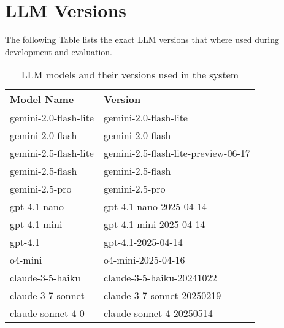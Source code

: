\section{LLM Versions}
The following Table lists the exact LLM versions that where used during development and evaluation.
\begin{longtable}{p{5cm} | p{6cm}}
    \caption{LLM models and their versions used in the system} \label{table:llm_versions} \\
    \hline
    \textbf{Model Name}   & \textbf{Version}                                              \\
    \hline
    \endfirsthead
    \hline
    \endfoot
    gemini-2.0-flash-lite & gemini-2.0-flash-lite                                         \\
    gemini-2.0-flash      & gemini-2.0-flash                                              \\
    gemini-2.5-flash-lite & gemini-2.5-flash-lite-preview-06-17                           \\
    gemini-2.5-flash      & gemini-2.5-flash                                              \\
    gemini-2.5-pro        & gemini-2.5-pro                                                \\
    gpt-4.1-nano          & gpt-4.1-nano-2025-04-14                                       \\
    gpt-4.1-mini          & gpt-4.1-mini-2025-04-14                                       \\
    gpt-4.1               & gpt-4.1-2025-04-14                                            \\
    o4-mini               & o4-mini-2025-04-16                                            \\
    claude-3-5-haiku      & claude-3-5-haiku-20241022                                     \\
    claude-3-7-sonnet     & claude-3-7-sonnet-20250219                                    \\
    claude-sonnet-4-0     & claude-sonnet-4-20250514                                      \\
    \hline
\end{longtable}

\newpage



\thispagestyle{empty}
\noindent


